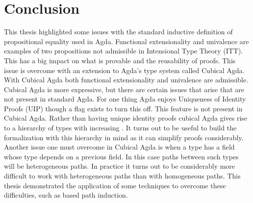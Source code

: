 \chapter{Conclusion}
This thesis highlighted some issues with the standard inductive
definition of propositional equality used in Agda.  Functional
extensionality and univalence are examples of two propositions not
admissible in Intensional Type Theory (ITT).  This has a big impact on
what is provable and the reusability of proofs.  This issue is
overcome with an extension to Agda's type system called Cubical Agda.
With Cubical Agda both functional extensionality and univalence are
admissible.  Cubical Agda is more expressive, but there are certain
issues that arise that are not present in standard Agda.  For one
thing Agda enjoys Uniqueness of Identity Proofs (UIP) though a flag
exists to turn this off.  This feature is not present in Cubical Agda.
Rather than having unique identity proofs cubical Agda gives rise to a
hierarchy of types with increasing .  It turns out to be useful to build the
formalization with this hierarchy in mind as it can simplify proofs
considerably.  Another issue one must overcome in Cubical Agda is when
a type has a field whose type depends on a previous field.  In this
case paths between such types will be heterogeneous paths.  In
practice it turns out to be considerably more difficult to work with
heterogeneous paths than with homogeneous paths.  This thesis
demonstrated the application of some techniques to overcome these
difficulties, such as based path induction.

